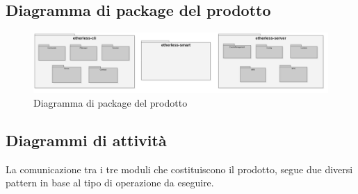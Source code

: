 	\begin{landscape}
		\subsection{Diagramma di package del prodotto}
		\begin{figure}[H]
			\centering
			\includegraphics[width=1.4\textwidth]{././diagrammi/generali/Etherless_package.png}
			\caption{Diagramma di package del prodotto}
		\end{figure}

	\end{landscape}
\newpage
\subsection{Diagrammi di attività}
	La comunicazione tra i tre moduli che costituiscono il prodotto, segue due diversi pattern in base al tipo di operazione da eseguire.
